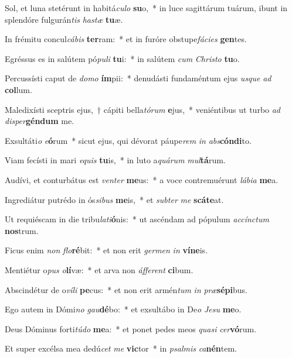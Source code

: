 \item Sol, et luna stetérunt in habitá\textit{cu}\textit{lo} \textbf{su}o,~* in luce sagittárum tuárum, ibunt in splendóre fulgurán\textit{tis} \textit{has}\textit{tæ} \textbf{tu}æ.
\item In frémitu concul\textit{cá}\textit{bis} \textbf{ter}ram:~* et in furóre obstupe\textit{fá}\textit{ci}\textit{es} \textbf{gen}tes.
\item Egréssus es in salútem pó\textit{pu}\textit{li} \textbf{tu}i:~* in salútem \textit{cum} \textit{Chris}\textit{to} \textbf{tu}o.
\item Percussísti caput de \textit{do}\textit{mo} \textbf{ím}pii:~* denudásti fundaméntum ejus \textit{us}\textit{que} \textit{ad} \textbf{col}lum.
\item Maledixísti sceptris ejus,~† cápiti bella\textit{tó}\textit{rum} \textbf{e}jus,~* veniéntibus ut turbo \textit{ad} \textit{di}\textit{sper}\textbf{gén}\textbf{dum} me.
\item Exsultáti\textit{o} \textit{e}\textbf{ó}rum~* sicut ejus, qui dévorat páupe\textit{rem} \textit{in} \textit{abs}\textbf{cón}\textbf{di}to.
\item Viam fecísti in mari \textit{e}\textit{quis} \textbf{tu}is,~* in luto a\textit{quá}\textit{rum} \textit{mul}\textbf{tá}rum.
\item Audívi, et conturbátus est \textit{ven}\textit{ter} \textbf{me}us:~* a voce contremuérunt \textit{lá}\textit{bi}\textit{a} \textbf{me}a.
\item Ingrediátur putrédo in ós\textit{si}\textit{bus} \textbf{me}is,~* et \textit{sub}\textit{ter} \textit{me} \textbf{scá}\textbf{te}at.
\item Ut requiéscam in die tribu\textit{la}\textit{ti}\textbf{ó}nis:~* ut ascéndam ad pópulum \textit{ac}\textit{cínc}\textit{tum} \textbf{nos}trum.
\item Ficus enim \textit{non} \textit{flo}\textbf{ré}bit:~* et non erit \textit{ger}\textit{men} \textit{in} \textbf{ví}\textbf{ne}is.
\item Mentiétur o\textit{pus} \textit{o}\textbf{lí}væ:~* et arva non \textit{áf}\textit{fe}\textit{rent} \textbf{ci}bum.
\item Abscindétur de o\textit{ví}\textit{li} \textbf{pe}cus:~* et non erit armén\textit{tum} \textit{in} \textit{præ}\textbf{sé}\textbf{pi}bus.
\item Ego autem in Dómi\textit{no} \textit{gau}\textbf{dé}bo:~* et exsultábo in De\textit{o} \textit{Je}\textit{su} \textbf{me}o.
\item Deus Dóminus forti\textit{tú}\textit{do} \textbf{me}a:~* et ponet pedes meos \textit{qua}\textit{si} \textit{cer}\textbf{vó}rum.
\item Et super excélsa mea dedú\textit{cet} \textit{me} \textbf{vic}tor~* in \textit{psal}\textit{mis} \textit{ca}\textbf{nén}tem.
